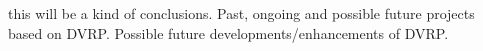 this will be a kind of conclusions. Past, ongoing and possible future projects based on DVRP. Possible future developments/enhancements of DVRP.


%
%
%

